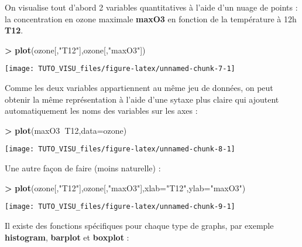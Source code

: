 \documentclass[]{article}
\newenvironment{Shaded}{\begin{snugshade}}{\end{snugshade}}
\newcommand{\DataTypeTok}[1]{\textcolor[rgb]{0.13,0.29,0.53}{#1}}
\newcommand{\KeywordTok}[1]{\textcolor[rgb]{0.13,0.29,0.53}{\textbf{#1}}}
\newcommand{\NormalTok}[1]{#1}
\newcommand{\OperatorTok}[1]{\textcolor[rgb]{0.81,0.36,0.00}{\textbf{#1}}}
\newcommand{\StringTok}[1]{\textcolor[rgb]{0.31,0.60,0.02}{#1}}
\theoremstyle{definition}
\theoremstyle{definition}
\theoremstyle{definition}
\theoremstyle{remark}
\begin{document}
On visualise tout d'abord 2 variables quantitatives à l'aide d'un nuage de points : la concentration en ozone maximale \textbf{maxO3} en fonction de la température à 12h \textbf{T12}.

\begin{Shaded}
\begin{Highlighting}[]
\OperatorTok{>}\StringTok{ }\KeywordTok{plot}\NormalTok{(ozone[,}\StringTok{"T12"}\NormalTok{],ozone[,}\StringTok{"maxO3"}\NormalTok{])}
\end{Highlighting}
\end{Shaded}

\begin{center}\texttt{[image: TUTO\_VISU\_files/figure-latex/unnamed-chunk-7-1]} \end{center}

Comme les deux variables appartiennent au même jeu de données, on peut obtenir la même représentation à l'aide d'une sytaxe plus claire qui ajoutent automatiquement les noms des variables sur les axes :

\begin{Shaded}
\begin{Highlighting}[]
\OperatorTok{>}\StringTok{ }\KeywordTok{plot}\NormalTok{(maxO3}\OperatorTok{~}\NormalTok{T12,}\DataTypeTok{data=}\NormalTok{ozone)}
\end{Highlighting}
\end{Shaded}

\begin{center}\texttt{[image: TUTO\_VISU\_files/figure-latex/unnamed-chunk-8-1]} \end{center}

Une autre façon de faire (moins naturelle) :

\begin{Shaded}
\begin{Highlighting}[]
\OperatorTok{>}\StringTok{ }\KeywordTok{plot}\NormalTok{(ozone[,}\StringTok{"T12"}\NormalTok{],ozone[,}\StringTok{"maxO3"}\NormalTok{],}\DataTypeTok{xlab=}\StringTok{"T12"}\NormalTok{,}\DataTypeTok{ylab=}\StringTok{"maxO3"}\NormalTok{)}
\end{Highlighting}
\end{Shaded}

\begin{center}\texttt{[image: TUTO\_VISU\_files/figure-latex/unnamed-chunk-9-1]} \end{center}

Il existe des fonctions spécifiques pour chaque type de graphs, par exemple \textbf{histogram}, \textbf{barplot} et \textbf{boxplot} :
\end{document}
